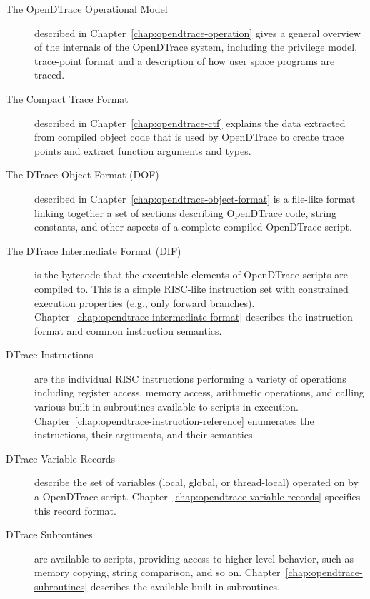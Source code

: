 \begin{description}

\item[The OpenDTrace Operational Model] described in
  Chapter~\ref{chap:opendtrace-operation} gives a general overview of
  the internals of the OpenDTrace system, including the privilege
  model, trace-point format and a description of how user space
  programs are traced.

\item[The Compact Trace Format] described in
  Chapter~\ref{chap:opendtrace-ctf} explains the data extracted from
  compiled object code that is used by OpenDTrace to create trace
  points and extract function arguments and types.

\item[The DTrace Object Format (DOF)] described in
  Chapter~\ref{chap:opendtrace-object-format} is a file-like format linking
  together a set of sections describing OpenDTrace code, string constants, and
  other aspects of a complete compiled OpenDTrace script.

\item[The DTrace Intermediate Format (DIF)] is the bytecode that the
  executable elements of OpenDTrace scripts are compiled to.
  This is a simple RISC-like instruction set with constrained execution
  properties (e.g., only forward branches).
  Chapter~\ref{chap:opendtrace-intermediate-format} describes the instruction
  format and common instruction semantics.

\item[DTrace Instructions] are the individual RISC instructions performing
  a variety of operations including register access, memory access, arithmetic
  operations, and calling various built-in subroutines available to scripts in
  execution.
  Chapter~\ref{chap:opendtrace-instruction-reference} enumerates the instructions,
  their arguments, and their semantics.

\item[DTrace Variable Records] describe the set of variables (local, global,
  or thread-local) operated on by a OpenDTrace script.
  Chapter~\ref{chap:opendtrace-variable-records} specifies this record format.

\item[DTrace Subroutines] are available to scripts, providing access to
  higher-level behavior, such as memory copying, string comparison, and so on.
  Chapter~\ref{chap:opendtrace-subroutines} describes the available built-in
  subroutines.

\end{description}
